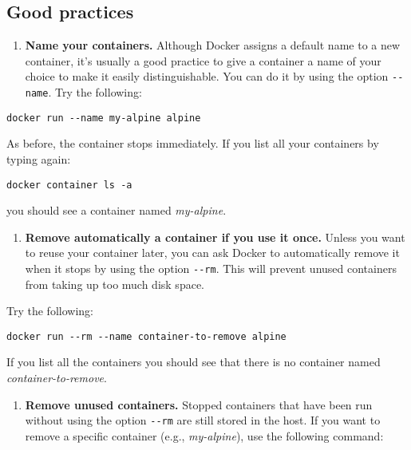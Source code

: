 \documentclass[
]{article}
\providecommand{\tightlist}{%
  \setlength{\itemsep}{0pt}\setlength{\parskip}{0pt}}
\theoremstyle{definition}
\theoremstyle{definition}
\theoremstyle{definition}
\theoremstyle{remark}
\begin{document}
\hypertarget{good-practices}{%
\subsection{Good practices}\label{good-practices}}

\begin{enumerate}
\def\labelenumi{\arabic{enumi}.}
\tightlist
\item
  \textbf{Name your containers.} Although Docker assigns a default name to a new container,
  it's usually a good practice to give a container a name of your
  choice to make it easily distinguishable. You can do it by using the option
  \texttt{-\/-name}. Try the following:
\end{enumerate}

\begin{verbatim}
docker run --name my-alpine alpine
\end{verbatim}

As before, the container stops immediately.
If you list all your containers by typing again:

\begin{verbatim}
docker container ls -a
\end{verbatim}

you should see a container named \emph{my-alpine}.

\begin{enumerate}
\def\labelenumi{\arabic{enumi}.}
\setcounter{enumi}{1}
\tightlist
\item
  \textbf{Remove automatically a container if you use it once.}
  Unless you want to reuse your container later, you can ask Docker to automatically remove it
  when it stops by using the option \texttt{-\/-rm}.
  This will prevent unused containers from taking up too much disk space.
\end{enumerate}

Try the following:

\begin{verbatim}
docker run --rm --name container-to-remove alpine
\end{verbatim}

If you list all the containers you should see that there is no container
named \emph{container-to-remove}.

\begin{enumerate}
\def\labelenumi{\arabic{enumi}.}
\setcounter{enumi}{2}
\tightlist
\item
  \textbf{Remove unused containers.} Stopped containers that have been run without
  using the option \texttt{-\/-rm} are still stored in the host.
  If you want to remove a specific
  container (e.g., \emph{my-alpine}), use the following command:
\end{enumerate}
\end{document}
